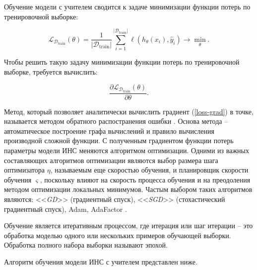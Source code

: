 Обучение модели с учителем сводится к задаче минимизации функции потерь по тренировочной выборке:

\begin{equation}
    \mathcal{L}_{\mathcal{D}_{\text{train}}}(\theta) = \frac{1}{\lvert \mathcal{D}_{\text{train}} \rvert}\sum_{i=1}^{\lvert \mathcal{D}_{\text{train}} \rvert}\ell(h_{\theta}(x_i),\hat y_i) \rightarrow \min_{\theta}.
\end{equation}

Чтобы решить такую задачу минимизации функции потерь по тренировочной выборке, требуется вычислить:

\begin{equation}
    \frac{\partial \mathcal{L}_{\mathcal{D}_{\text{train}}}(\theta)}{\partial \theta}.
    \label{loss-grad}
\end{equation}

Метод, который позволяет аналитически вычислить градиент (\ref{loss-grad}) в точке, называется методом обратного распостранения ошибки \cite{backprop-theory}. Основа метода -- автоматическое построение графа вычислений и правило вычисления производной сложной функции. С полученным градиентом функции потерь параметры модели ИНС меняются алгоритмом оптимизации. Одними из важных составляющих алгоритмов оптимизации являются выбор размера шага оптимизатора $\eta$, называемым еще скоростью обучения, и планировщик скорости обучения $\varsigma$, поскольку влияют на скорость процесса обучения и на преодоления методом оптимизации локальных минимумов. Частым выбором таких алгоритмов являются: <<\textit{GD}>> (градиентный спуск), <<\textit{SGD}>> (стохастический градиентный спуск), Adam, AdaFactor \cite{optimizers-paper,adafactor-paper}.

Обучение является итеративным процессом, где итерация или шаг итерации -- это обработка моделью одного или нескольких примеров обучающей выборки. Обработка полного набора выборки называют эпохой.

Алгоритм обучения модели ИНС с учителем представлен ниже.

